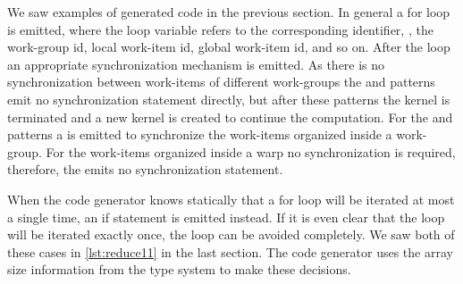 We saw examples of generated \OpenCL code in the previous section.
In general a for loop is emitted, where the loop variable refers to the corresponding identifier, \ie, the work-group id, local work-item id, global work-item id, and so on.
After the loop an appropriate synchronization mechanism is emitted.
As there is no synchronization between work-items of different work-groups the \mapWorkgroup and \mapGlobal patterns emit no synchronization statement directly, but after these patterns the \OpenCL kernel is terminated and a new \OpenCL kernel is created to continue the computation.
For the \mapLocal and \mapWarp patterns a  is emitted to synchronize the work-items organized inside a work-group.
For the work-items organized inside a warp no synchronization is required, therefore, the \mapLane emits no synchronization statement.

When the code generator knows statically that a for loop will be iterated at most a single time, an if statement is emitted instead.
If it is even clear that the loop will be iterated exactly once, the loop can be avoided completely.
We saw both of these cases in \autoref{lst:reduce11} in the last section.
The code generator uses the array size information from the type system to make these decisions.

